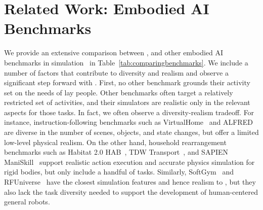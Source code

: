 \section{Related Work: Embodied AI Benchmarks}
\label{sec:related}



 

We provide an extensive comparison between \benchmark, and other embodied AI benchmarks in simulation~\cite{batra2020rearrangement,weihs2021visual,gan2021threedworld,puig2018virtualhome,shridhar2020alfred,xia2020interactive,yu2020meta,james2019rlbench,savva2019habitat,szot2021habitat} in Table~\ref{tab:comparingbenchmarks}. We include a number of factors that contribute to diversity and realism and observe a significant step forward with \benchmark.
First, no other benchmark grounds their activity set on the needs of lay people.  
Other benchmarks often target a relatively restricted set of activities, and their simulators are realistic only in the relevant aspects for those tasks. In fact, we often observe a diversity-realism tradeoff. For instance, instruction-following benchmarks such as VirtualHome~\cite{puig2018virtualhome} and ALFRED~\cite{puig2018virtualhome, shridhar2020alfred} are diverse in the number of scenes, objects, and state changes, but offer a limited low-level physical realism. On the other hand, household rearrangement benchmarks such as Habitat 2.0 HAB~\cite{szot2021habitat}, TDW Transport~\cite{gan2021threedworld}, and SAPIEN ManiSkill~\cite{xiang2020sapien,mu2021maniskill} support realistic action execution and accurate physics simulation for rigid bodies, but only include a handful of tasks. Similarly, SoftGym~\cite{lin2020softgym} and RFUniverse~\cite{fu2022rfuniverse} have the closest simulation features and hence realism to \simulator, but they also lack the task diversity needed to support the development of human-centered general robots. %


